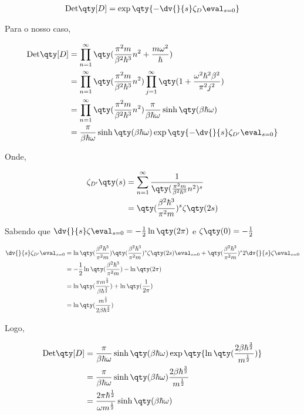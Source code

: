 \documentclass[twoside]{amsart}
\numberwithin{equation}{section}
\newcommand{\Det}[1]{\textup{Det} #1}
\begin{document}
\begin{refsection}
\begin{align}
    \Det\qty[D]=\exp\qty{-\dv{}{s}\zeta_D\eval_{s=0}}
\end{align}

Para o nosso caso,

\begin{align}
    \Det\qty[D]&=\prod\limits_{n=1}^{\infty}\qty(\frac{\pi^2m}{\beta^2\hbar^3}n^2+\frac{m\omega^2}{\hbar})\\
    &=\prod\limits_{n=1}^{\infty}\qty(\frac{\pi^2m}{\beta^2\hbar^3}n^2)\prod\limits_{j=1}^{\infty}\qty(1+\frac{\omega^2\hbar^2\beta^2}{\pi^2j^2})\\
    &=\prod\limits_{n=1}^{\infty}\qty(\frac{\pi^2m}{\beta^2\hbar^3}n^2)\frac{\pi}{\beta\hbar\omega}\sinh\qty(\beta\hbar\omega) \\
    &=\frac{\pi}{\beta\hbar\omega}\sinh\qty(\beta\hbar\omega)\exp\qty{-\dv{}{s}\zeta_{D'}\eval_{s=0}}
\end{align}

Onde,

\begin{align}
    \zeta_{D'}\qty(s)&=\sum\limits_{n=1}^{\infty}\frac{1}{\qty(\frac{\pi^2m}{\beta^2\hbar^3}n^2)^s}\\
    &=\qty(\frac{\beta^2\hbar^3}{\pi^2m})^s\zeta\qty(2s)
\end{align}

Sabendo que $\dv{}{s}\zeta\eval_{s=0}=-\frac12\ln\qty(2\pi)$ e $\zeta\qty(0)=-\frac12$

\begin{align}
    \dv{}{s}\zeta_{D'}\eval_{s=0}&=\ln\qty(\frac{\beta^2\hbar^3}{\pi^2 m})\qty(\frac{\beta^2\hbar^3}{\pi^2m})^s\zeta\qty(2s)\eval_{s=0}+\qty(\frac{\beta^2\hbar^3}{\pi^2m})^s2\dv{}{s}\zeta\eval_{s=0}\\
    &=-\frac12\ln\qty(\frac{\beta^2\hbar^3}{\pi^2 m})-\ln\qty(2\pi)\\
    &=\ln\qty(\frac{\pi m^\frac12}{\beta\hbar^{\frac32}})+\ln\qty(\frac{1}{2\pi})\\
    &=\ln\qty(\frac{m^\frac12}{2\beta\hbar^\frac32})
\end{align}

Logo,

\begin{align}
    \Det\qty[D]&=\frac{\pi}{\beta\hbar\omega}\sinh\qty(\beta\hbar\omega)\exp\qty{\ln\qty(\frac{2\beta\hbar^\frac32}{m^\frac12})}\\
    &=\frac{\pi}{\beta\hbar\omega}\sinh\qty(\beta\hbar\omega)\frac{2\beta\hbar^\frac32}{m^\frac12}\\
    &=\frac{2\pi\hbar^\frac12}{\omega m^\frac12}\sinh\qty(\beta\hbar\omega)
\end{align}


\end{refsection}
\end{document}
